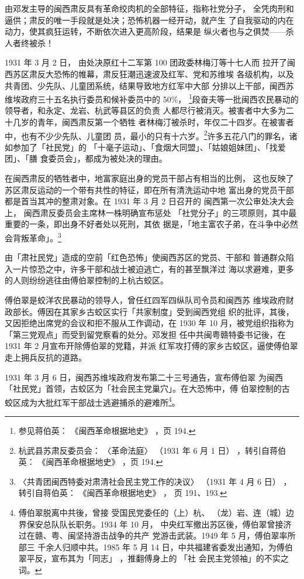 由邓发主导的闽西肃反具有革命绞肉机的全部特征，指称社党分子，
全凭肉刑和逼供；肃反的唯一手段就是处决；恐怖机器一经开动，就产生
了自我驱动的内在动力，使其疯狂运转，不断依次进入更高阶段，结果是
纵火者也与之俱焚——杀人者终被杀！

1931 年 3 月 2 日，
由处决原红十二军第 100 团政委林梅汀等十七人而
拉开了闽西苏区肃反大恐怖的帷幕，肃反狂潮迅速波及红军、党和苏维埃
各级机构，以及共青团、少先队、儿童团系统，结果导致地方红军中大部
分排以上干部，闽西苏维埃政府三十五名执行委员和候补委员中的 50\%，
\footnote{参见蒋伯英：
《闽西革命根据地史》
，页 194.}段奋夫等一批闽西农民暴动的领导者，和永定、龙岩、杭武等县区的负责
人都尽行被消灭。被害者中大多为二十几岁的青年，闽西肃反第一个牺牲
者林梅汀被杀时，年仅二十四岁。在被害者中，也有不少少先队、儿童团
员，最小的只有十六岁。\footnote{杭武县苏肃反委员会：
〈革命法庭〉
（1931 年 6 月 1 日）
，转引自蒋伯英：
《闽西革命根据地史》
，页
194.}许多五花八门的罪名，诸如参加了「社民党」的
「十毫子运动」、「食烟大同盟」、「姑娘姐妹团」、「找爱团」、「膳
食委员会」，都成为被处决的理由。

在闽西肃反的牺牲者中，地富家庭出身的党员干部占有相当的比例，
这也反映了苏区肃反运动的一个带有共性的特征，即在所有清洗运动中地
富出身的党员干部都是首当其冲的整肃对象。在 1931 年 3 月 2 日召开的
闽西第一次公审处决大会上，
闽西肃反委员会主席林一株明确宣布惩处
「社党分子」的三项原则，其中最重要的一条，即出身不好者处以死刑，其依
据是，「地主富农子弟，在斗争中必然会背叛革命」。\footnote{〈共青团闽西特委对肃清社会民主党工作的决议〉
（1931 年 4 月 6 日）
，转引自蒋伯英：
《闽西革命根据地史》
，
页 191、193.} 

由「肃社民党」造成的空前「红色恐怖」使闽西苏区的党员、干部和
普通群众陷入一片惊恐之中，许多干部和战士被迫逃亡，有的甚至飘洋过
海以求避难，更多的人则纷纷逃往由傅伯翠控制的上杭古蛟区。

傅伯翠是蛟洋农民暴动的领导人，曾任红四军四纵队司令员和闽西苏
维埃政府财政部长。傅因在其家乡古蛟区实行「共家制度」受到闽西党组
织的批评，其後，又因拒绝出席党的会议和拒不服从工作调动，在 1930
年 10 月，被党组织指称为「第三党观点」而受到留党察看的处分。邓发担
任中共闽粤赣特委书记後，在 1931 年 2 月宣布开除傅伯翠的党籍，并派
红军攻打傅的家乡古蛟区，逼使傅伯翠走上拥兵反抗的道路。

1931 年 3 月 6 日，闽西苏维埃政府发布第二十三号通告，宣布傅伯翠 为闽西
「社民党」首领，古蛟区为「社会民主党巢穴」。在大恐怖中，傅 伯翠控制的古
蛟区成为大批红军干部战士逃避捕杀的避难所\footnote{傅伯翠脱离中共後，曾接
受国民党委任的（上）杭、 （龙）岩、连（城）边界保安总队队长职务。1934 年
10 月， 中央红军撤出苏区後，傅伯翠曾接济过在赣、粤、闽坚持游击战争的共产
党游击武装。1949 年 5 月，傅伯翠率所部三 千余人归顺中共。1985 年 5 月 14
日，中共福建省委发出通知，为傅伯翠平反，宣布其为「同志」 ，推翻傅身上的
「社 会民主党领袖」的不实之词。}。

